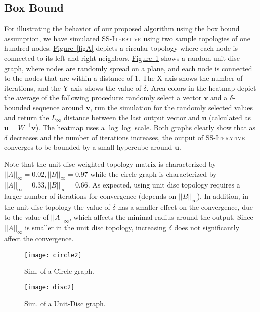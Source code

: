 \documentclass[preprint,12pt]{elsarticle}
\newcommand{\namedref}[2]{\hyperref[#2]{#1~\ref*{#2}}}
\newcommand{\figureref}[1]{\namedref{Figure}{#1}}
\newcommand\normi[1]{\left|\left|#1\right|\right|_\infty}
\newcommand{\syncAlg}{\textsc{SS-Iterative}\xspace}
\newcommand{\uu}{\mathbf{u}}
\newcommand{\vv}{\mathbf{v}}
\begin{document}
\subsection{Box Bound}
For illustrating the behavior of our proposed algorithm using the box
bound assumption, we have simulated \syncAlg using two sample topologies of one hundred nodes.
\figureref{figA} depicts a circular topology where each node is
connected to its left and right neighbors. \figureref{figB} shows a
random unit disc graph, where nodes are randomly spread on a
plane, and each node is connected to the nodes that are within a
distance of 1.  The X-axis shows the number of iterations, and the Y-axis shows the value of
$\delta$. Area colors in the heatmap depict the
average of the following procedure: randomly select a vector
$\vv$ and a $\delta$-bounded sequence around $\vv$,
run the simulation for the randomly selected values and return the
$L_\infty$ distance between the last output vector and $\uu$
(calculated as $\uu = W^{-1}\vv$). The heatmap uses a $\log \log$ scale. Both graphs clearly show that as $\delta$ decreases
and the number of iterations increases, the output of \syncAlg
converges to be bounded by a small hypercube around $\uu$.

Note that the unit disc weighted topology matrix is characterized by
$\normi{A}=0.02,\normi{B}=0.97$ while the circle graph
is characterized by $\normi{A}=0.33,\normi{B}=0.66$. As expected,
using unit disc topology requires a larger number of iterations
for convergence (depends on $\normi{B}$). In addition, in the unit
disc topology the value of $\delta$ has a smaller effect on the
convergence, due to the value of $\normi{A}$, which affects the minimal radius around the output.
Since $\normi{A}$ is smaller in the unit disc topology,
increasing $\delta$ does not significantly affect the convergence.

\begin{figure}[h!]
\begin{minipage}[b]{0.5\linewidth}
\centering
  \hspace{1.25in} \texttt{[image: circle2]}
  \vspace{-0.5cm}
  \caption{Sim. of a Circle graph.}
  \label{figA}
\end{minipage}
\begin{minipage}[b]{0.5\linewidth}
\centering
  \hspace{1.25in} \texttt{[image: disc2]}
  \vspace{-0.5cm}
  \caption{Sim. of a Unit-Disc graph.}
  \label{figB}
\end{minipage}
\end{figure}
\end{document}
